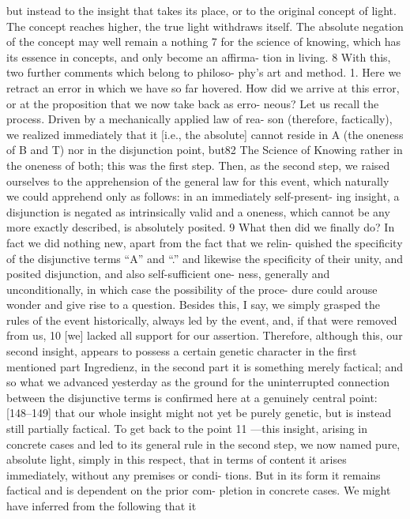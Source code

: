 but instead to the insight that takes its place, or to the original concept of
light. The concept reaches higher, the true light withdraws itself. The
absolute negation of the concept may well remain a nothing 7 for the science
of knowing, which has its essence in concepts, and only become an affirma-
tion in living. 8 With this, two further comments which belong to philoso-
phy’s art and method.
1. Here we retract an error in which we have so far hovered. How did
we arrive at this error, or at the proposition that we now take back as erro-
neous? Let us recall the process. Driven by a mechanically applied law of rea-
son (therefore, factically), we realized immediately that it [i.e., the absolute]
cannot reside in A (the oneness of B and T) nor in the disjunction point, but82
The Science of Knowing
rather in the oneness of both; this was the first step. Then, as the second step,
we raised ourselves to the apprehension of the general law for this event, which
naturally we could apprehend only as follows: in an immediately self-present-
ing insight, a disjunction is negated as intrinsically valid and a oneness, which
cannot be any more exactly described, is absolutely posited. 9 What then did we
finally do? In fact we did nothing new, apart from the fact that we relin-
quished the specificity of the disjunctive terms “A” and “.” and likewise the
specificity of their unity, and posited disjunction, and also self-sufficient one-
ness, generally and unconditionally, in which case the possibility of the proce-
dure could arouse wonder and give rise to a question. Besides this, I say, we
simply grasped the rules of the event historically, always led by the event, and,
if that were removed from us, 10 [we] lacked all support for our assertion.
Therefore, although this, our second insight, appears to possess a certain
genetic character in the first mentioned part {Ingredienz}, in the second part
it is something merely factical; and so what we advanced yesterday as the
ground for the uninterrupted connection between the disjunctive terms is
confirmed here at a genuinely central point: [148–149] that our whole insight
might not yet be purely genetic, but is instead still partially factical. To get back
to the point 11 —this insight, arising in concrete cases and led to its general rule
in the second step, we now named pure, absolute light, simply in this respect,
that in terms of content it arises immediately, without any premises or condi-
tions. But in its form it remains factical and is dependent on the prior com-
pletion in concrete cases. We might have inferred from the following that it
